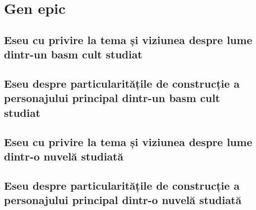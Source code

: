 \documentclass[
 12pt,                       %
 a4paper                     %
]{book}
\renewcommand{\headrulewidth}{0pt}
\renewcommand{\footrulewidth}{1pt}
\renewcommand{\headrulewidth}{2pt}
\renewcommand{\footrulewidth}{1pt}
\begin{document}

\clearpage
{
  \pagestyle{empty}
  {
    \fancyhf{}
    \renewcommand{\headrulewidth}{0pt}
    \renewcommand{\footrulewidth}{0pt}
  }
  \tableofcontents       %
  \thispagestyle{empty}
}
\pagestyle{plain}        %







\part{Gen epic}


\chapter{Eseu cu privire la tema și viziunea despre lume dintr-un basm cult studiat}


\chapter{Eseu despre particularitățile de construcție a personajului principal dintr-un basm cult studiat}



\chapter{Eseu cu privire la tema și viziunea despre lume dintr-o nuvelă studiată}


\chapter{Eseu despre particularitățile de construcție a personajului principal dintr-o nuvelă studiată}

\end{document}
